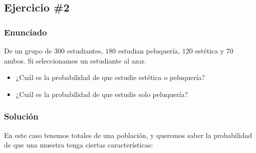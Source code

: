 \documentclass[12pt,a4paper]{article}
\begin{document}
\subsection{Ejercicio \#2}

\subsubsection{Enunciado}

De un grupo de \(300\) estudiantes, \(180\) estudian peluquería, \(120\) estética y \(70\) ambos. Si seleccionamos un estudiante al azar.
\begin{itemize}
  \item [a)] ¿Cuál es la probabilidad de que estudie estética o peluquería?
  \item [b)] ¿Cuál es la probabilidad de que estudie solo peluquería?
\end{itemize}

\subsubsection{Solución}

En este caso tenemos totales de una población, y queremos saber la probabilidad de que una muestra tenga ciertas características:
\end{document}
